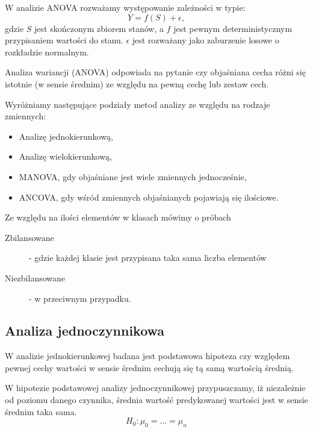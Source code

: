 \documentclass[10pt,a4paper]{book}
\begin{document}
\begin{definition}[ANOVA]
W analizie ANOVA rozważamy występowanie zależności w typie:
\begin{equation*}
Y = f(S) + \epsilon,
\end{equation*}
gdzie $S$ jest skończonym zbiorem stanów, a $f$ jest pewnym deterministycznym przypisaniem wartości do stanu. $\epsilon$ jest rozważany jako zaburzenie losowe o rozkładzie normalnym.
\end{definition}

Analiza wariancji (ANOVA) odpowiada na pytanie czy objaśniana cecha różni się istotnie (w sensie średnim) ze względu na pewną cechę lub zestaw cech.

Wyróżniamy następujące podziały metod analizy ze względu na rodzaje zmiennych:
\begin{itemize}
\item Analizę jednokierunkową,
\item Analizę wielokierunkową,
\item MANOVA, gdy objaśniane jest wiele zmiennych jednocześnie,
\item ANCOVA, gdy wśród zmiennych objaśnianych pojawiają się ilościowe.
\end{itemize}
Ze względu na ilości elementów w klasach mówimy o próbach
\begin{description}
\item[Zbilansowane] - gdzie każdej klasie jest przypisana taka sama liczba elementów 
\item[Niezbilansowane] - w przeciwnym przypadku.
\end{description}

\subsection{Analiza jednoczynnikowa}

W analizie jednokierunkowej badana jest podstawowa hipoteza czy względem pewnej cechy wartości w sensie średnim cechują się tą samą wartością średnią. 
\begin{definition}
W hipotezie podstawowej analizy jednoczynnikowej przypuszczamy, iż niezależnie od poziomu danego czynnika, średnia wartość predykowanej wartości jest w sensie średnim taka sama.
\begin{equation*}
H_0 : \mu_0 = \ldots = \mu_n
\end{equation*}
\end{definition}
\end{document}

